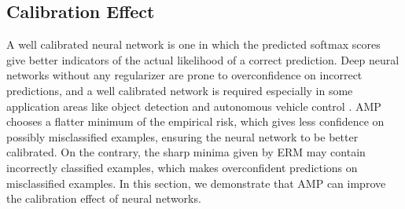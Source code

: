 \documentclass[final]{cvpr}
\begin{document}
\begin{table}[t]
\centering
{}
\caption{Mean and standard deviation of top-1 errors (\%) on SVHN, CIFAR-10 and CIFAR-100 over 10 trials.}
\label{tab:cvresults2}
\end{table}

\subsection{Calibration Effect}\label{sec:calibration}

A well calibrated neural network is one in which the predicted softmax scores give better indicators of the actual likelihood of a correct prediction. Deep neural networks without any regularizer are prone to overconfidence on incorrect predictions, and a well calibrated network is required especially in some application areas like object detection \cite{girshick2015fast,ren2015faster} and autonomous vehicle control \cite{chen2015deepdriving,levinson2011towards}. AMP chooses a flatter minimum of the empirical risk, which gives less confidence on possibly misclassified examples, ensuring the neural network to be better calibrated. On the contrary, the sharp minima given by ERM may contain incorrectly classified examples, which makes overconfident predictions on misclassified examples. In this section, we demonstrate that AMP can improve the calibration effect of neural networks.
\end{document}

